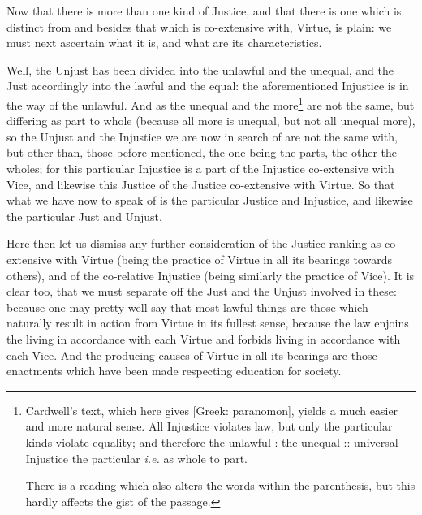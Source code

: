 
Now that there is more than one kind of Justice, and that there is one which is
distinct from and besides that which is co-extensive with, Virtue, is plain: we
must next ascertain what it is, and what are its characteristics.

Well, the Unjust has been divided into the unlawful and the unequal, and the
Just accordingly into the lawful and the equal: the aforementioned Injustice is
in the way of the unlawful. And as the unequal and the more\footnote{Cardwell’s text, which here gives [Greek: paranomon], yields a much
easier and more natural sense. All Injustice violates law, but only the
particular kinds violate equality; and therefore the unlawful : the unequal ::
universal Injustice the particular \emph{i.e.} as whole to part.

There is a reading which also alters the words within the parenthesis, but
this hardly affects the gist of the passage.}
are not the same, but differing as part to whole (because all more is unequal,
but not all unequal more), so the Unjust and the Injustice we are now in search
of are not the same with, but other than, those before mentioned, the one being
the parts, the other the wholes; for this particular Injustice is a part of the
Injustice co-extensive with Vice, and likewise this Justice of the Justice
co-extensive with Virtue. So that what we have now to speak of is the
particular Justice and Injustice, and likewise the particular Just and Unjust.

Here then let us dismiss any further consideration of the Justice ranking as
co-extensive with Virtue (being the practice of Virtue in all its bearings
towards others), and of the co-relative Injustice (being similarly the practice
of Vice). It is clear too, that we must separate off the Just and the Unjust
involved in these: because one may pretty well say that most lawful things are
those which naturally result in action from Virtue in its fullest sense,
because the law enjoins the living in accordance with each Virtue and forbids
living in accordance with each Vice. And the producing causes of Virtue in all
its bearings are those enactments which have been made respecting education for
society.

